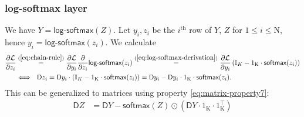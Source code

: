 \documentclass{article}
\newcommand{\const}[1]{\ensuremath{\mathrm{#1}}} %
\newcommand{\func}[1]{\ensuremath{\textsf{#1}}} %
\newcommand{\Gradient}{\textsf{D}}
\newcommand{\Derivative}[2]{\ensuremath{\frac{\partial #1}{\partial #2}}}
\newcommand{\Partial}[1]{\frac{\partial}{\partial #1}}
\begin{document}
\subsubsection*{log-softmax layer}
We have $Y = \func{log-softmax}(Z)$.
Let $y_i, z_i$ be the $i^\text{th}$ row of $Y$, $Z$ for $1 \leq i \leq \const{N}$, hence $y_i = \func{log-softmax}(z_i)$.
We calculate
\begin{align*}
  \Derivative{\mathcal{L}}{z_i} 
  & \overset{(\ref{eq:chain-rule})}{=} 
    \Derivative{\mathcal{L}}{y_i} \Partial{z_i} \func{log-softmax}(z_i)
  \overset{(\ref{eq:log-softmax-derivation})}{=}
  \Derivative{\mathcal{L}}{y_i}
    \left( 
       \mathbb{I}_K - 1_\const{K} \cdot \func{softmax}(z_i)
    \right)
  \\
  & \Longleftrightarrow~~ \Gradient{z_i} = \Gradient{y_i} \cdot 
      \left( 
       \mathbb{I}_K - 1_\const{K} \cdot \func{softmax}(z_i)
    \right)
  = \Gradient y_i - \Gradient y_i \cdot 1_\const{K} \cdot \func{softmax}(z_i).  
\end{align*}
This can be generalized to matrices using property \ref{eq:matrix-property7}:
\begin{align}
\Gradient Z &= \Gradient Y - \func{softmax}(Z) \odot
(\Gradient Y \cdot 1_\const{K} \cdot 1_\const{K}^\top)
\end{align}
\end{document}
